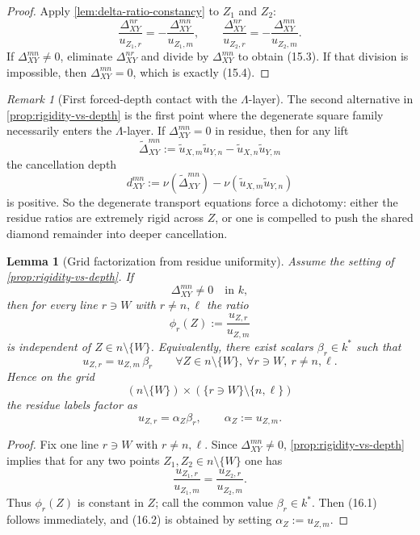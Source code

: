 \documentclass[11pt]{amsart}
\numberwithin{equation}{section}
\theoremstyle{plain}
\newtheorem{lemma}[theorem]{Lemma}
\theoremstyle{definition}
\theoremstyle{remark}
\newtheorem{remark}[theorem]{Remark}
\newcommand{\Lam}{\Lambda}
\begin{document}
\begin{proof}
Apply \cref{lem:delta-ratio-constancy} to $Z_1$ and $Z_2$:
\[
\frac{\Delta_{XY}^{nr}}{u_{Z_1,r}}=-\frac{\Delta_{XY}^{mn}}{u_{Z_1,m}},
\qquad
\frac{\Delta_{XY}^{nr}}{u_{Z_2,r}}=-\frac{\Delta_{XY}^{mn}}{u_{Z_2,m}}.
\]
If $\Delta_{XY}^{mn}\neq 0$, eliminate $\Delta_{XY}^{nr}$ and divide by $\Delta_{XY}^{mn}$ to obtain \textup{(15.3)}. If that division is impossible, then $\Delta_{XY}^{mn}=0$, which is exactly \textup{(15.4)}.
\end{proof}

\begin{remark}[First forced-depth contact with the $\Lam$-layer]
\label{rem:forced-depth-contact}
The second alternative in \cref{prop:rigidity-vs-depth} is the first point where the degenerate square family necessarily enters the $\Lam$-layer. If $\Delta_{XY}^{mn}=0$ in residue, then for any lift
\[
\widetilde\Delta_{XY}^{mn}:=\widetilde u_{X,m}\widetilde u_{Y,n}-\widetilde u_{X,n}\widetilde u_{Y,m}
\]
the cancellation depth
\[
d_{XY}^{mn}:=\nu(\widetilde\Delta_{XY}^{mn})-\nu(\widetilde u_{X,m}\widetilde u_{Y,n})
\]
is positive. So the degenerate transport equations force a dichotomy: either the residue ratios are extremely rigid across $Z$, or one is compelled to push the shared diamond remainder into deeper cancellation.
\end{remark}

\begin{lemma}[Grid factorization from residue uniformity]
\label{lem:grid-factorization}
Assume the setting of \cref{prop:rigidity-vs-depth}. If
\[
\Delta_{XY}^{mn}\neq 0
\quad\text{in }k,
\]
then for every line $r\ni W$ with $r\neq n,\ell$ the ratio
\[
\phi_r(Z):=\frac{u_{Z,r}}{u_{Z,m}}
\]
is independent of $Z\in n\setminus\{W\}$. Equivalently, there exist scalars $\beta_r\in k^*$ such that
\[
u_{Z,r}=u_{Z,m}\,\beta_r
\qquad\forall Z\in n\setminus\{W\},\ \forall r\ni W,\ r\neq n,\ell.
\tag{16.1}
\]
Hence on the grid
\[
(n\setminus\{W\})\times(\{r\ni W\}\setminus\{n,\ell\})
\]
the residue labels factor as
\[u_{Z,r}=\alpha_Z\beta_r,
\qquad
\alpha_Z:=u_{Z,m}.
\tag{16.2}
\]
\end{lemma}

\begin{proof}
Fix one line $r\ni W$ with $r\neq n,\ell$. Since $\Delta_{XY}^{mn}\neq 0$, \cref{prop:rigidity-vs-depth} implies that for any two points $Z_1,Z_2\in n\setminus\{W\}$ one has
\[
\frac{u_{Z_1,r}}{u_{Z_1,m}}=\frac{u_{Z_2,r}}{u_{Z_2,m}}.
\]
Thus $\phi_r(Z)$ is constant in $Z$; call the common value $\beta_r\in k^*$. Then \textup{(16.1)} follows immediately, and \textup{(16.2)} is obtained by setting $\alpha_Z:=u_{Z,m}$.
\end{proof}
\end{document}
